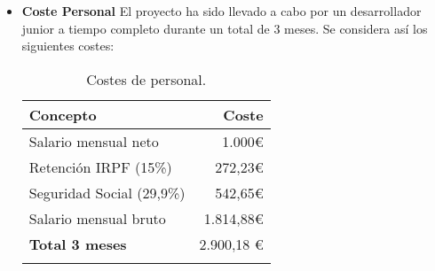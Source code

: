 \begin{itemize}
	\item \textbf{Coste Personal}
	El proyecto ha sido llevado a cabo por un desarrollador junior a tiempo completo durante un total de 3 meses. Se considera así los siguientes costes:
	\begin{longtable}[]{@{}lr@{}}
\toprule
\begin{minipage}[b]{0.38\columnwidth}\raggedright\strut
\textbf{Concepto}\strut
\end{minipage} & \begin{minipage}[b]{0.20\columnwidth}\raggedright\strut
\textbf{Coste}\strut
\end{minipage}\tabularnewline
\midrule
\endhead
\begin{minipage}[t]{0.38\columnwidth}\raggedright\strut
Salario mensual neto\strut
\end{minipage} & \begin{minipage}[t]{0.20\columnwidth}\raggedright\strut
1.000\euro{}\strut
\end{minipage}\tabularnewline
\begin{minipage}[t]{0.38\columnwidth}\raggedright\strut
Retención IRPF (15\%)\strut
\end{minipage} & \begin{minipage}[t]{0.20\columnwidth}\raggedright\strut
272,23\euro{}\strut
\end{minipage}\tabularnewline
\begin{minipage}[t]{0.38\columnwidth}\raggedright\strut
Seguridad Social (29,9\%)\strut
\end{minipage} & \begin{minipage}[t]{0.20\columnwidth}\raggedright\strut
542,65\euro{}\strut
\end{minipage}\tabularnewline
\begin{minipage}[t]{0.38\columnwidth}\raggedright\strut
Salario mensual bruto\strut
\end{minipage} & \begin{minipage}[t]{0.20\columnwidth}\raggedright\strut
1.814,88\euro{}\strut
\end{minipage}\tabularnewline
\midrule
\begin{minipage}[t]{0.38\columnwidth}\raggedright\strut
\textbf{Total 3 meses}\strut
\end{minipage} & \begin{minipage}[t]{0.20\columnwidth}\raggedright\strut
2.900,18 \euro{}\strut
\end{minipage}\tabularnewline
\bottomrule
\caption{Costes de personal.}
\end{longtable}


\end{itemize}
